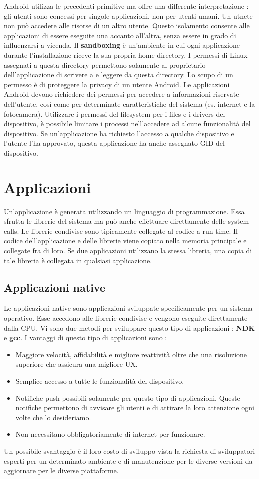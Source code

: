 \documentclass[12pt]{report}
\begin{document}
Android utilizza le precedenti primitive ma offre una differente interpretazione : gli utenti sono concessi per singole applicazioni, non per utenti umani. Un utnete non può accedere alle risorse di un altro utente. Questo isolamento consente alle applicazioni di essere eseguite una accanto all'altra, senza essere in grado di influenzarsi a vicenda. Il \textbf{sandboxing} è un'ambiente in cui ogni applicazione durante l'installazione riceve la sua propria home directory. I permessi di Linux assegnati a questa directory permettono solamente al proprietario dell'applicazione di scrivere a e leggere da questa directory. Lo scupo di un permesso è di proteggere la privacy di un utente Android. Le applicazioni Android devono richiedere dei permessi per accedere a informazioni riservate dell'utente, così come per determinate caratteristiche del sistema (es. internet e la fotocamera). Utilizzare i permessi del filesystem per i files e i drivers del dispositivo, è possibile limitare i processi nell'accedere ad alcune funzionalità del dispositivo. Se un'applicazione ha richiesto l'accesso a qualche dispositivo e l'utente l'ha approvato, questa applicazione ha anche assegnato GID del dispositivo.
\section{Applicazioni}
Un'applicazione è generata utilizzando un linguaggio di programmazione. Essa sfrutta le librerie del sistema ma può anche effettuare direttamente delle system calls. Le librerie condivise sono tipicamente collegate al codice a run time. Il codice dell'applicazione e delle librerie viene copiato nella memoria principale e collegate fra di loro. Se due applicazioni utilizzano la stessa libreria, una copia di tale libreria è collegata in qualsiasi applicazione.
\subsection{Applicazioni native}
Le applicazioni native sono applicazioni sviluppate specificamente per un sistema operativo. Esse accedono alle librerie condivise e vengono eseguite direttamente dalla CPU. Vi sono due metodi per sviluppare questo tipo di applicazioni : \textbf{NDK} e \textbf{gcc}. I vantaggi di questo tipo di applicazioni sono : 
\begin{itemize}
\item Maggiore velocità, affidabilità e migliore reattività oltre che una risoluzione superiore che assicura una migliore UX.
\item Semplice accesso a tutte le funzionalità del dispositivo.
\item Notifiche push possibili solamente per questo tipo di applicazioni. Queste notifiche permettono di avvisare gli utenti e di attirare la loro attenzione ogni volte che lo desideriamo.
\item Non necessitano obbligatoriamente di internet per funzionare.
\end{itemize}
Un possibile svantaggio è il loro costo di sviluppo vista la richiesta di sviluppatori esperti per un determinato ambiente e di manutenzione per le diverse versioni da aggiornare per le diverse piattaforme.
\end{document}
